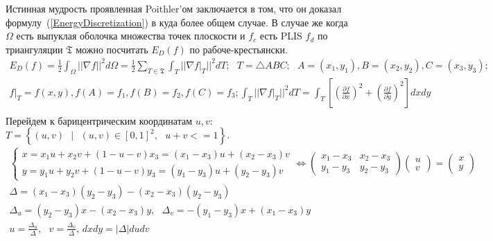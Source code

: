 \documentclass{article}
\begin{document}
\begin{enumerate}
    Истинная мудрость проявленная Poithler'ом заключается в том, что он доказал формулу~(\ref{EnergyDiscretization}) в куда более общем случае.
    В случае же когда $\Omega$ есть выпуклая оболочка множества точек плоскости и $f_c$ есть PLIS $f_d$ по триангуляции $\mathfrak{T}$ можно посчитать $E_D(f)$ по рабоче-крестьянски.
    \begin{multline*}
        E_D(f) = \frac{1}{2} \int_{\Omega}{||\nabla{f}||^2 d\Omega} = \frac{1}{2} \sum_{T \in \mathfrak{T}}\int_{T}{||\nabla{f|_T}||^2 dT}; 
        \mbox{ } T = \triangle ABC; \mbox{ } A=(x_1, y_1), B=(x_2, y_2), C=(x_3, y_3); \\
        f|_T = f(x, y), f(A) = f_1, f(B) = f_2, f(C) = f_3; \int_{T}{||\nabla{f|_T}||^2 dT} = 
        \int_{T}{\left[\left(\frac{\partial f}{\partial x}\right)^2 + \left(\frac{\partial f}{\partial y}\right)^2 \right] dx dy} \\
    \end{multline*}
    Перейдем к барицентрическим координатам $u, v$: $T = \left\{(u, v)\mbox{ } | \mbox{ } (u, v) \in \left[0, 1 \right]^2 ,\mbox{ } u + v <= 1 \right\}$. 
    \begin{multline*}
        \begin{cases}
            x = x_1 u + x_2 v + (1-u-v) x_3 = (x_1 - x_3) u + (x_2 - x_3) v \\
            y = y_1 u + y_2 v + (1-u-v) y_3 = (y_1 - y_3) u + (y_2 - y_3) v
        \end{cases} 
        \Leftrightarrow
        \begin{pmatrix}
            x_1 - x_3 & x_2 - x_3 \\
            y_1 - y_3 & y_2 - y_3 
        \end{pmatrix} 
        \begin{pmatrix}
            u \\
            v
        \end{pmatrix} 
        =
        \begin{pmatrix}
            x \\
            y
        \end{pmatrix} \\
        \Delta = (x_1 - x_3) (y_2 - y_3) - (x_2 - x_3) (y_2 - y_3) \\ 
        \Delta_u = (y_2 - y_3) x - (x_2 - x_3) y, \mbox{ } \Delta_v = -(y_1 - y_3) x + (x_1 - x_3) y \\
        u = \frac{\Delta_u}{\Delta}, \mbox{ } v = \frac{\Delta_v}{\Delta} \mbox{, } dxdy = |\Delta| dudv \\

\end{multline*}
\end{enumerate}
\end{document}
